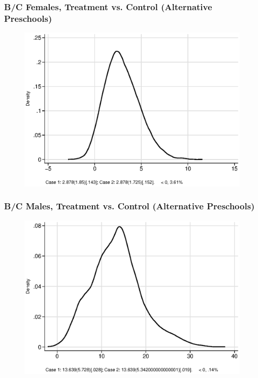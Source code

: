\documentclass[static]{JJH-Beamer}
\begin{document}
\begin{frame}
\frametitle{B/C Females, Treatment vs. Control (Alternative Preschools)} 
\begin{figure}
	\includegraphics[width=.8\columnwidth]{output/ratios_8_sexf.eps}
\end{figure}
\end{frame}


\begin{frame}
\frametitle{B/C Males, Treatment vs. Control (Alternative Preschools)} 
\begin{figure}
	\includegraphics[width=.8\columnwidth]{output/ratios_8_sexm.eps}
\end{figure}
\end{frame}

\end{document}
